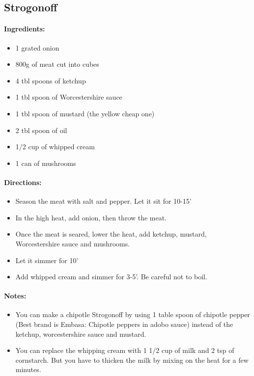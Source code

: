 \documentclass{article}
\begin{document}
\subsection{Strogonoff}

\paragraph{Ingredients:}
\begin{itemize}
    \item 1 grated onion
    \item 800g of meat cut into cubes
    \item 4 tbl spoons of ketchup
    \item 1 tbl spoon of Worcestershire sauce
    \item 1 tbl spoon of mustard (the yellow cheap one)
    \item 2 tbl spoon of oil
    \item 1/2 cup of whipped cream
    \item 1 can of mushrooms
\end{itemize}

\paragraph{Directions:}
\begin{itemize}
    \item Season the meat with salt and pepper. Let it sit for 10-15'
    \item In the high heat, add onion, then throw the meat.
    \item Once the meat is seared, lower the heat, add ketchup, mustard, Worcestershire sauce and mushrooms.
    \item Let it simmer for 10'
    \item Add whipped cream and simmer for 3-5'. Be careful not to boil.
\end{itemize}

\paragraph{Notes:}
\begin{itemize}
    \item You can make a chipotle Strogonoff by using 1 table spoon of chipotle pepper (Best brand is Embasa: Chipotle peppers in adobo sauce) instead of the ketchup, worcestershire sauce and mustard.
    \item You can replace the whipping cream with 1 1/2 cup of milk and 2 tsp of cornstarch. But you have to thicken the milk by mixing on the heat for a few minutes.
\end{itemize}
\end{document}
